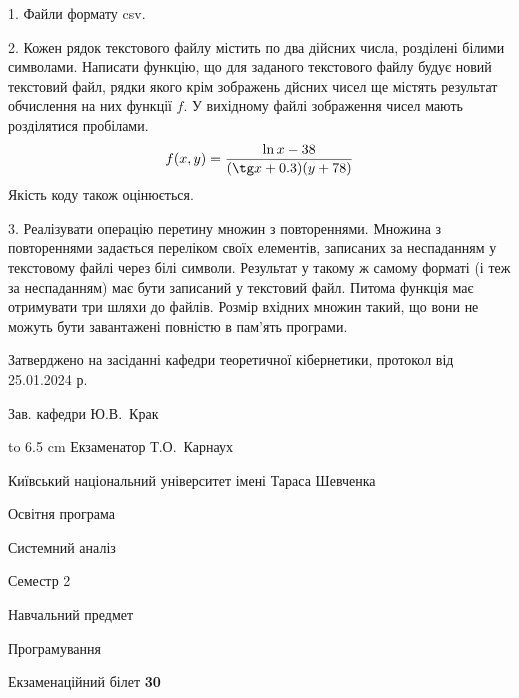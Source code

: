 \documentclass[12pt, ukrainian]{article}
\begin{document}
{%
1. Файли формату csv.%
\par
\vspace{2mm}

2. Кожен рядок текстового файлу містить по два дійсних числа, розділені білими символами.
Написати функцію, що для заданого текстового файлу будує новий текстовий файл, рядки якого крім зображень дйсних чисел ще містять результат обчислення на них функції $f$. У вихідному файлі зображення чисел мають розділятися пробілами. 
$$f(x, y) =\frac{\ln x - 38}{(\tg x + 0.3) (y + 78)}$$ 
Якість коду також оцінюється.

\par
\vspace{2mm}

3. Реалізувати операцію перетину множин з повтореннями. Множина з повтореннями задається переліком своїх елементів, записаних за неспаданням у текстовому файлі через білі символи. Результат у такому ж самому форматі (і теж за неспаданням) має бути записаний у текстовий файл. Питома функція має отримувати три шляхи до файлів. Розмір вхідних множин такий, що вони не можуть бути завантажені повністю в пам’ять програми.

}
{\smallskip\smallskip \begin {scriptsize} Затверджено на засіданні кафедри теоретичної кібернетики, протокол   від   25.01.2024 р.\par\smallskip\smallskip\smallskip\smallskip
{\parbox {6.5 cm} {Зав. кафедри \dotfill Ю.В.~Крак}}\hspace {0.7cm} {\hbox to 6.5 cm { Екзаменатор \dotfill Т.О.~Карнаух}} \end{scriptsize}}
\vspace{0.9cm}
{{\begin {scriptsize}\par
{ \center  Київський національний університет імені Тараса Шевченка \par}
{\parbox {5 cm}{Освітня програма \hfill}{\parbox {7 cm}{Системний аналіз\hfill}}\parbox {6 cm}{\hfill Семестр 2}}\par
{\parbox {5 cm} {Навчальний предмет \hfill}\parbox {7 cm}{Програмування \hfill}\parbox {6cm}{\hfill}\par}\vspace{-15pt} \end{scriptsize}}{\center Екзаменаційний білет \No \textbf { 30 }\par}}
\end{document}
